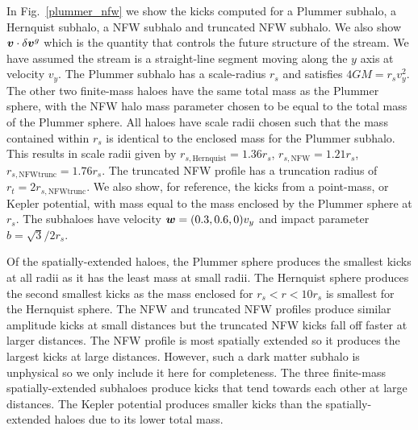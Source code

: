 \documentclass[useAMS,usenatbib,fleqn,a4paper]{mn2e}
\newcommand{\bs}[1]{\bmath{#1}}
\begin{document}
In Fig.~\ref{plummer_nfw} we show the kicks computed for a Plummer subhalo, a Hernquist subhalo, a NFW subhalo and truncated NFW subhalo. We also show $\bs{v}\cdot\delta\bs{v}^g$ which is the quantity that controls the future structure of the stream. We have assumed the stream is a straight-line segment moving along the $y$ axis at velocity $v_y$. The Plummer subhalo has a scale-radius $r_s$ and satisfies $4GM=r_sv_y^2$. The other two finite-mass haloes have the same total mass as the Plummer sphere, with the NFW halo mass parameter chosen to be equal to the total mass of the Plummer sphere. All haloes have scale radii chosen such that the mass contained within $r_s$ is identical to the enclosed mass for the Plummer subhalo. This results in scale radii given by $r_{s,\mathrm{Hernquist}}=1.36r_s$, $r_{s,\mathrm{NFW}}=1.21r_s$, $r_{s,\mathrm{NFW trunc}}=1.76r_s$. The truncated NFW profile has a truncation radius of $r_t=2r_{s,\mathrm{NFW trunc}}$. We also show, for reference, the kicks from a point-mass, or Kepler potential, with mass equal to the mass enclosed by the Plummer sphere at $r_s$. The subhaloes have velocity $\bs{w}=(0.3,0.6,0)v_y$ and impact parameter $b=\sqrt{3}/2r_s$.

Of the spatially-extended haloes, the Plummer sphere produces the smallest kicks at all radii as it has the least mass at small radii. The Hernquist sphere produces the second smallest kicks as the mass enclosed for $r_s<r<10r_s$ is smallest for the Hernquist sphere. The NFW and truncated NFW profiles produce similar amplitude kicks at small distances but the truncated NFW kicks fall off faster at larger distances. The NFW profile is most spatially extended so it produces the largest kicks at large distances. However, such a dark matter subhalo is unphysical so we only include it here for completeness. The three finite-mass spatially-extended subhaloes produce kicks that tend towards each other at large distances. The Kepler potential produces smaller kicks than the spatially-extended haloes due to its lower total mass.
\end{document}
